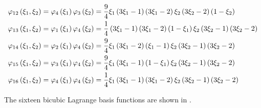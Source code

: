 \begin{equation}
\begin{split}
    \lbfn{12}{\xione,\xitwo}&=\lbfn{4}{\xione}\lbfn{3}{\xitwo}=
    \frac94\xione\pbrac{3\xione-1}\pbrac{3\xione-2}\xitwo\pbrac{3\xitwo-2}\pbrac{1-\xitwo} \\
    \lbfn{13}{\xione,\xitwo}&=\lbfn{1}{\xione}\lbfn{4}{\xitwo}=
    \frac14\pbrac{3\xione-1}\pbrac{3\xione-2}\pbrac{1-\xione}\xitwo\pbrac{3\xitwo-1}\pbrac{3\xitwo-2}\\
    \lbfn{14}{\xione,\xitwo}&=\lbfn{2}{\xione}\lbfn{4}{\xitwo}=
    \frac94\xione\pbrac{3\xione-2}\pbrac{\xione-1}\xitwo\pbrac{3\xitwo-1}\pbrac{3\xitwo-2} \\
    \lbfn{15}{\xione,\xitwo}&=\lbfn{3}{\xione}\lbfn{4}{\xitwo}=
    \frac94\xione\pbrac{3\xione-1}\pbrac{1-\xione}\xitwo\pbrac{3\xitwo-1}\pbrac{3\xitwo-2} \\
    \lbfn{16}{\xione,\xitwo}&=\lbfn{4}{\xione}\lbfn{4}{\xitwo}=
    \frac14\xione\pbrac{3\xione-1}\pbrac{3\xione-2}\xitwo\pbrac{3\xitwo-1}\pbrac{3\xitwo-2}
  \end{split}
\end{equation}

The sixteen \twodal bicubic Lagrange basis functions are shown in .

            
